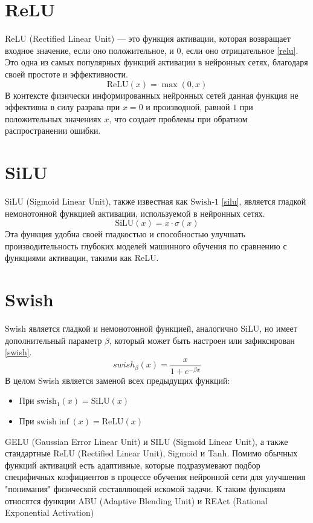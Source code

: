 \section{ReLU}

ReLU (Rectified Linear Unit) — это функция активации, которая возвращает входное значение,
если оно положительное, и 0, если оно отрицательное \eqref{relu}. Это одна из самых популярных 
функций активации в нейронных сетях, благодаря своей простоте и эффективности. 
\begin{equation}
    \text{ReLU}(x) = \max(0, x)
    \label{relu}
\end{equation}
В контексте физически информированных нейронных сетей данная функция не эффективна в силу
разрава при $x = 0$ и производной, равной $1$ при положительных значениях $x$, что создает
проблемы при обратном распространении ошибки.

\section{SiLU}
SiLU (Sigmoid Linear Unit), также известная как $\text{Swish-}1$ \eqref{silu}, является
гладкой немонотонной функцией активации, используемой в нейронных сетях.
\begin{equation}
    \text{SiLU}(x) = x \cdot \sigma(x) \label{silu}
\end{equation}
Эта функция удобна своей гладкостью и способностью улучшать производительность глубоких
моделей машинного обучения по сравнению с функциями активации, такими как ReLU.
\section{Swish}
Swish является гладкой и немонотонной функцией, аналогично SiLU, но имеет дополнительный
параметр $\beta$, который может быть настроен или зафиксирован \eqref{swish}.
\begin{equation}
    \label{swish}
    swish_\beta(x) = \frac{x}{1 + e^{-\beta x}}
\end{equation}
В целом Swish является заменой всех предыдущих функций:
\begin{itemize}
    \item При $\text{swish}_1(x) = \text{SiLU}(x)$
    \item При $\text{swish}\inf(x) = \text{ReLU}(x)$
\end{itemize}

GELU (Gaussian Error Linear Unit) и
SILU (Sigmoid Linear Unit), а также стандартные ReLU (Rectified Linear Unit), Sigmoid
и Tanh. Помимо обычных функций активаций есть адаптивные, которые подразумевают подбор
специфичных коэфициентов в процессе обучения нейронной сети для улучшения "понимания"
физической составляющей искомой задачи. К таким функциям относятся функции ABU
(Adaptive Blending Unit) и REAct (Rational Exponential Activation)

